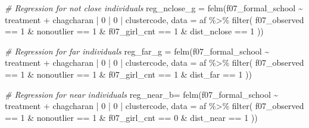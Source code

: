\documentclass[
]{article}
\newenvironment{Shaded}{\begin{snugshade}}{\end{snugshade}}
\newcommand{\AttributeTok}[1]{\textcolor[rgb]{0.77,0.63,0.00}{#1}}
\newcommand{\CommentTok}[1]{\textcolor[rgb]{0.56,0.35,0.01}{\textit{#1}}}
\newcommand{\DecValTok}[1]{\textcolor[rgb]{0.00,0.00,0.81}{#1}}
\newcommand{\FunctionTok}[1]{\textcolor[rgb]{0.00,0.00,0.00}{#1}}
\newcommand{\NormalTok}[1]{#1}
\newcommand{\OtherTok}[1]{\textcolor[rgb]{0.56,0.35,0.01}{#1}}
\newcommand{\SpecialCharTok}[1]{\textcolor[rgb]{0.00,0.00,0.00}{#1}}
\begin{document}
\begin{Shaded}
\begin{Highlighting}[]
\CommentTok{\# Regression for not close individuals}
\NormalTok{reg\_nclose\_g }\OtherTok{=} \FunctionTok{felm}\NormalTok{(f07\_formal\_school }\SpecialCharTok{\textasciitilde{}}\NormalTok{ treatment }\SpecialCharTok{+} 
\NormalTok{                   chagcharan }\SpecialCharTok{|} \DecValTok{0} \SpecialCharTok{|} \DecValTok{0} \SpecialCharTok{|}\NormalTok{ clustercode,}
         \AttributeTok{data =}\NormalTok{ af }\SpecialCharTok{\%\textgreater{}\%} \FunctionTok{filter}\NormalTok{( }
\NormalTok{                              f07\_observed }\SpecialCharTok{==} \DecValTok{1} \SpecialCharTok{\&}
\NormalTok{                              nonoutlier }\SpecialCharTok{==} \DecValTok{1} \SpecialCharTok{\&}
\NormalTok{                              f07\_girl\_cnt }\SpecialCharTok{==} \DecValTok{1} \SpecialCharTok{\&}
\NormalTok{                              dist\_nclose }\SpecialCharTok{==} \DecValTok{1}
\NormalTok{                              ))}

\CommentTok{\# Regression for far individuals}
\NormalTok{reg\_far\_g }\OtherTok{=} \FunctionTok{felm}\NormalTok{(f07\_formal\_school }\SpecialCharTok{\textasciitilde{}}\NormalTok{ treatment }\SpecialCharTok{+} 
\NormalTok{                   chagcharan }\SpecialCharTok{|} \DecValTok{0} \SpecialCharTok{|} \DecValTok{0} \SpecialCharTok{|}\NormalTok{ clustercode,}
         \AttributeTok{data =}\NormalTok{ af }\SpecialCharTok{\%\textgreater{}\%} \FunctionTok{filter}\NormalTok{( }
\NormalTok{                              f07\_observed }\SpecialCharTok{==} \DecValTok{1} \SpecialCharTok{\&}
\NormalTok{                              nonoutlier }\SpecialCharTok{==} \DecValTok{1} \SpecialCharTok{\&}
\NormalTok{                              f07\_girl\_cnt }\SpecialCharTok{==} \DecValTok{1} \SpecialCharTok{\&}
\NormalTok{                              dist\_far }\SpecialCharTok{==} \DecValTok{1}
\NormalTok{                              ))}

\CommentTok{\# Regression for near individuals}
\NormalTok{reg\_near\_b}\OtherTok{=} \FunctionTok{felm}\NormalTok{(f07\_formal\_school }\SpecialCharTok{\textasciitilde{}}\NormalTok{ treatment }\SpecialCharTok{+} 
\NormalTok{                   chagcharan }\SpecialCharTok{|} \DecValTok{0} \SpecialCharTok{|} \DecValTok{0} \SpecialCharTok{|}\NormalTok{ clustercode,}
         \AttributeTok{data =}\NormalTok{ af }\SpecialCharTok{\%\textgreater{}\%} \FunctionTok{filter}\NormalTok{( }
\NormalTok{                              f07\_observed }\SpecialCharTok{==} \DecValTok{1} \SpecialCharTok{\&}
\NormalTok{                              nonoutlier }\SpecialCharTok{==} \DecValTok{1} \SpecialCharTok{\&}
\NormalTok{                              f07\_girl\_cnt }\SpecialCharTok{==} \DecValTok{0} \SpecialCharTok{\&}
\NormalTok{                              dist\_near }\SpecialCharTok{==} \DecValTok{1}
\NormalTok{                              ))}


\end{Highlighting}
\end{Shaded}
\end{document}
